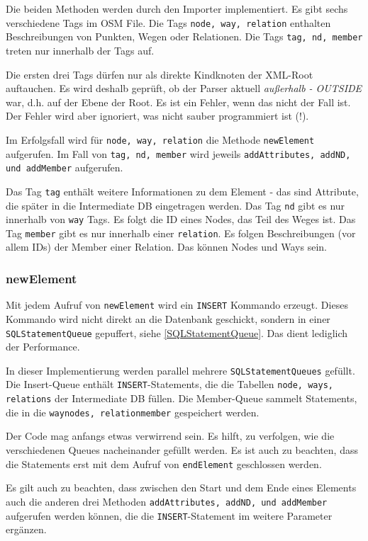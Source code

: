 Die beiden Methoden werden durch den Importer implementiert. Es gibt sechs verschiedene
Tags im OSM File. Die Tags {\tt node, way, relation} enthalten Beschreibungen von Punkten,
Wegen oder Relationen. Die Tags {\tt tag, nd, member} treten nur innerhalb der Tags
auf.

Die ersten drei Tags dürfen nur als direkte Kindknoten der XML-Root
auftauchen. Es wird deshalb geprüft, ob der Parser aktuell {\it außerhalb - OUTSIDE}
war, d.h. auf der Ebene der Root. Es ist ein Fehler, wenn das nicht der Fall ist.
Der Fehler wird aber ignoriert, was nicht sauber programmiert ist (!).

Im Erfolgsfall wird für {\tt node, way, relation} die Methode {\tt newElement} aufgerufen.
Im Fall von {\tt tag, nd, member} wird jeweils {\tt addAttributes, addND, und addMember} aufgerufen.

Das Tag {\tt tag} enthält weitere Informationen zu dem Element - das sind Attribute,
die später in die Intermediate DB eingetragen werden. Das Tag {\tt nd} gibt es nur innerhalb
von {\tt way} Tags. Es folgt die ID eines Nodes, das Teil des Weges ist. Das Tag {\tt member}
gibt es nur innerhalb einer {\tt relation}. Es folgen Beschreibungen (vor allem IDs)
der Member einer Relation. Das können Nodes und Ways sein.

\subsubsection{newElement}
Mit jedem Aufruf von {\tt newElement} wird ein {\tt INSERT} Kommando erzeugt.
Dieses Kommando wird nicht direkt an die Datenbank geschickt, sondern in einer 
{\tt SQLStatementQueue} gepuffert, siehe \ref{SQLStatementQueue}. Das dient lediglich
der Performance.

In dieser Implementierung werden parallel mehrere {\tt SQLStatementQueues} gefüllt.
Die Insert-Queue enthält {\tt INSERT}-Statements, die die Tabellen {\tt node, ways, relations}
der Intermediate DB füllen. Die Member-Queue sammelt Statements, die in die {\tt waynodes, relationmember}
gespeichert werden.

Der Code mag anfangs etwas verwirrend sein. Es hilft, zu verfolgen, wie die verschiedenen
Queues nacheinander gefüllt werden. Es ist auch zu beachten, dass die Statements erst mit
dem Aufruf von {\tt endElement} geschlossen werden. 

Es gilt auch zu beachten, dass zwischen den Start und dem Ende eines Elements auch
die anderen drei Methoden {\tt addAttributes, addND, und addMember} aufgerufen werden
können, die die {\tt INSERT}-Statement im weitere Parameter ergänzen.

